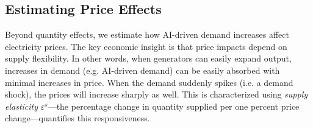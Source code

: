 \documentclass[sigconf,authordraft]{acmart}
\newcommand{\nb}[1]{\textcolor{blue}{NB[#1]}}
\begin{document}
\subsection{Estimating Price Effects}\label{PriceEffects}
Beyond quantity effects, we estimate how AI-driven demand increases affect electricity prices. The key economic insight is that price impacts depend on supply flexibility. In other words, when generators can easily expand output, increases in demand (e.g. AI-driven demand) can be easily absorbed with minimal increases in price. When the demand suddenly spikes (i.e. a demand shock), the prices will increase sharply as well. This is characterized using \textit{supply elasticity} $\varepsilon^s$—the percentage change in quantity supplied per one percent price change—quantifies this responsiveness.

\end{document}
